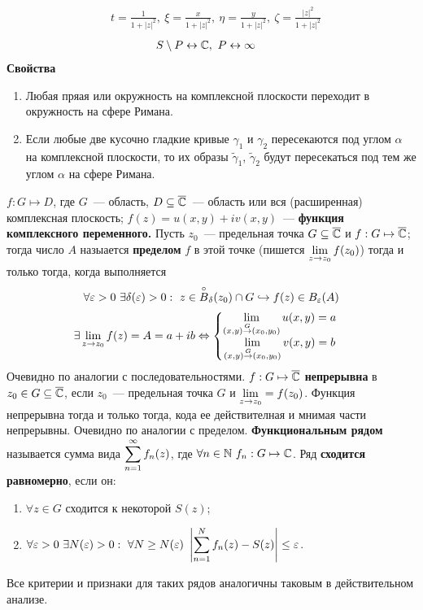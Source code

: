 \begin{align*}
  & t = \frac{1}{1+ \left| z \right|^2}, \ \xi = \frac{x}{1+ \left| z \right|^2}, \ \eta = \frac{y}{1+ \left| z \right|^2}, \ \zeta = \frac{\left| z \right|^2}{1+ \left| z \right|^2}
\end{align*}
\begin{align*}
  & S \setminus P \leftrightarrow \mathbb{C}, \ P \leftrightarrow \infty
\end{align*}
\textbf{Свойства}
\begin{enumerate}
    \item Любая пряая или окружность на комплексной плоскости переходит в
    окружность на сфере Римана.
    \item Если любые две кусочно гладкие кривые $\gamma_1$ и $\gamma_2$
    пересекаются под углом $\alpha$ на комплексной плоскости, то их образы
    $\tilde{\gamma}_1$, $\tilde{\gamma}_2$ будут пересекаться под тем же углом
    $\alpha$ на сфере Римана.
\end{enumerate}
\Def
$f: G \mapsto D$, где $G$~--- область, $D \subseteq \overline{\mathbb{C}}$~--- область или вся
(расширенная) комплексная плоскость; $f(z) = u(x,y) + iv(x,y)$~---
\textbf{функция комплексного переменного.}
\Def
Пусть $z_0$~--- предельная точка $G \subseteq \overline{\mathbb{C}}$ и $f: G \mapsto \overline{\mathbb{C}}$; тогда
число $A$ назыается \textbf{пределом} $f$ в этой точке (пишется $\displaystyle \lim_{z \to
  z_0} f(z_0)$) тогда и только тогда, когда выполняется
\begin{equation}\label{(2.3)}
    \forall \varepsilon > 0 \ \exists \delta(\varepsilon) > 0: \ z \in \overset{\circ}{B}_\delta(z_0)\cap G \hookrightarrow f(z) \in B_\varepsilon (A)
\end{equation}
\asm
\begin{align*}
  & \exists \lim_{z \to z_0}f(z) = A = a+ib \Leftrightarrow \left\{ \begin{matrix}
          \displaystyle \lim_{(x,y)\overset{G}{\to}(x_0,y_0)}u(x,y) = a \\
          \displaystyle \lim_{(x,y)\overset{G}{\to}(x_0,y_0)}v(x,y) = b
      \end{matrix} \right.
\end{align*}
\pr
Очевидно по аналогии с последовательностями.
\Def
$f: G \mapsto \overline{\mathbb{C}}$ \textbf{непрерывна} в $z_0 \in G \subseteq \overline{\mathbb{C}}$, если
$z_0$~--- предельная точка $G$ и $\displaystyle \lim_{z \to z_0} = f(z_0)$.
\asm
Функция непрерывна тогда и только тогда, кода ее действителная и мнимая части
непрерывны.
\pr Очевидно по аналогии с пределом.
\Def
\textbf{Функциональным рядом} называется сумма вида $\displaystyle \sum_{n=1}^\infty
f_n(z)$, где $\forall n \in \mathbb{N} \ f_n :G \mapsto \mathbb{C}$.
\Def
Ряд \textbf{сходится равномерно}, если он:
\begin{enumerate}
    \item $\forall z \in G$ сходится к некоторой $S(z)$;
    \item $\forall \varepsilon > 0 \ \exists N(\varepsilon) > 0: \ \forall N \geq N
    (\varepsilon) \ \left| \displaystyle \sum_{n=1}^Nf_n(z) - S(z) \right|\leq
    \varepsilon$.
\end{enumerate}
Все критерии и признаки для таких рядов аналогичны таковым в действительном
анализе.    
